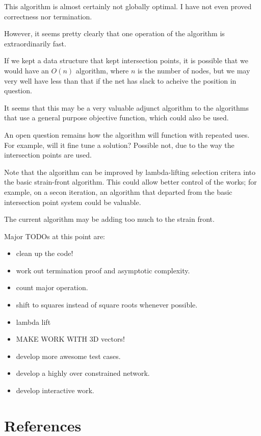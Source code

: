 \documentclass[11pt]{article}
\begin{document}
This algorithm is almost certainly not globally optimal.  I have not even proved correctness
nor termination.

However, it seems pretty clearly that one operation of the algorithm is extraordinarily fast.

If we kept a data structure that kept intersection points, it is possible that we would
have an $O(n)$ algorithm, where $n$ is the number of nodes, but we may very well have
less than that if the net has slack to acheive the position in question.

It seems that this may be a very valuable adjunct algorithm to the algorithms that
use a general purpose objective function, which could also be used.

An open question remains how the algorithm will function with repeated uses.
For example, will it fine tune a solution?  Possible not, due to the way the
intersection points are used.

Note that the algorithm can be improved by lambda-lifting selection critera into
the basic strain-front algorithm. This could allow better control of the  works;
for example, on a secon iteration, an algorithm that departed from the basic
intersection point system could be valuable.

The current algorithm may be adding too much to the strain front.

Major TODOs at this point are:
\begin{itemize}
\item clean up the code!
\item work out termination proof and asymptotic complexity.
\item count major operation.
\item shift to squares instead of square roots whenever possible.
\item lambda lift
\item MAKE WORK WITH 3D vectors!
\item develop more awesome test cases.
  \item develop a highly over constrained network.
  \item develop interactive work.
  \end{itemize}




\section{References}
\end{document}

